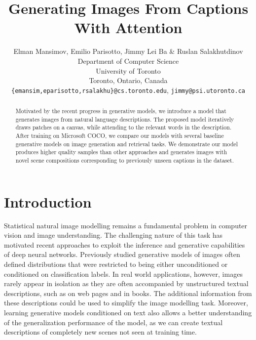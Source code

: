 \documentclass{article} %
\title{Generating Images From Captions\\ With Attention}
\author{
Elman Mansimov, Emilio Parisotto, Jimmy Lei Ba \& Ruslan Salakhutdinov\\
Department of Computer Science\\
University of Toronto\\
Toronto, Ontario, Canada \\
\texttt{\{emansim,eparisotto,rsalakhu\}@cs.toronto.edu}, \texttt{jimmy@psi.utoronto.ca}
}
\begin{document}
\maketitle

\begin{abstract}
Motivated by the recent progress in generative models, we introduce a model that generates images from natural language descriptions. The proposed model iteratively draws patches on a canvas, while attending to the relevant words in the description. After training on Microsoft COCO, we compare our models with several baseline generative models on image generation and retrieval tasks. We demonstrate our model produces higher quality samples than other approaches and generates images with novel scene compositions corresponding to previously unseen captions in the dataset. 
\end{abstract}

\section{Introduction}

Statistical natural image modelling remains a fundamental problem in computer vision and image understanding. The challenging nature of this task has motivated recent approaches to exploit the inference and generative capabilities of deep neural networks.
Previously studied generative models of images often defined distributions that were restricted to being either unconditioned or conditioned on classification labels. In real world applications, however, images rarely appear in isolation as they are often accompanied by unstructured textual descriptions, such as on web pages and in books. 
The additional information from these descriptions could be used to simplify the image modelling task. Moreover, learning generative models conditioned on text also allows a better understanding of the generalization performance of the model, as we can create textual descriptions of completely new scenes not seen at training time. 
\end{document}
